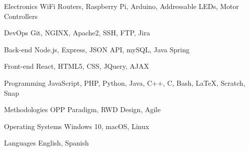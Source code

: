 

\begin{cvskills}

  \cvskill
    {Electronics} %
    {WiFi Routers, Raspberry Pi, Arduino, Addressable LEDs, Motor Controllers } %

  \cvskill
    {DevOps} %
    {Git, NGINX, Apache2, SSH, FTP, Jira} %

  \cvskill
    {Back-end} %
    {Node.js, Express, JSON API, mySQL, Java Spring} %

  \cvskill
    {Front-end} %
    {React, HTML5, CSS, JQuery, AJAX} %

  \cvskill
    {Programming} %
    {JavaScript, PHP, Python, Java, C++, C, Bash, LaTeX, Scratch, Snap} %

  \cvskill
    {Methodologies} %
    {OPP Paradigm, RWD Design, Agile} %

  \cvskill
    {Operating Systems} %
    {Windows 10, macOS, Linux} %


  \cvskill
    {Languages} %
    {English, Spanish} %


\end{cvskills}
